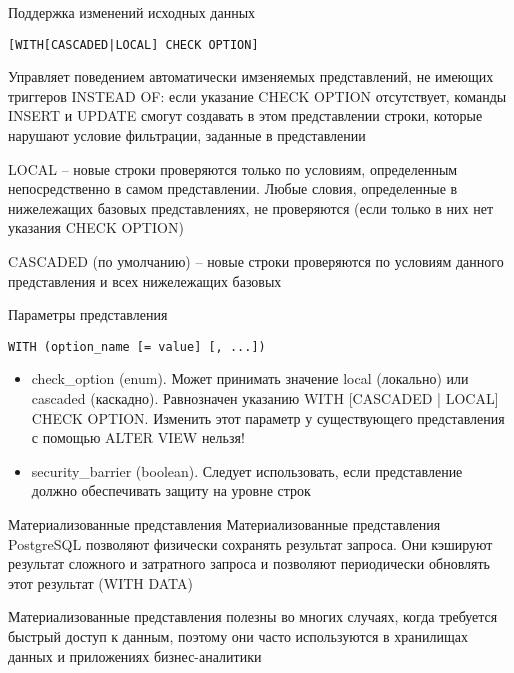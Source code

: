 \documentclass[12pt]{article}
\begin{document}
\begin{nota}{Поддержка изменений исходных данных}
\begin{lstlisting}
[WITH[CASCADED|LOCAL] CHECK OPTION]
\end{lstlisting}

    Управляет поведением автоматически имзеняемых представлений, не имеющих триггеров INSTEAD OF: если указание CHECK OPTION отсутствует, команды INSERT и UPDATE смогут создавать в этом представлении строки, которые нарушают условие фильтрации, заданные в представлении 

    LOCAL -- новые строки проверяются только по условиям, определенным непосредственно в самом представлении. Любые словия, определенные в нижележащих базовых представлениях, не проверяются (если только в них нет указания CHECK OPTION)

    CASCADED (по умолчанию) -- новые строки проверяются по условиям данного представления и всех нижележащих базовых 
\end{nota}

\begin{nota}{Параметры представления}
\begin{lstlisting}
WITH (option_name [= value] [, ...])
\end{lstlisting}

    \begin{itemize}
        \item check\_option (enum). Может принимать значение local (локально) или cascaded (каскадно). Равнозначен указанию WITH [CASCADED | LOCAL] CHECK OPTION. Изменить этот параметр у существующего представления с помощью ALTER VIEW нельзя!
        \item security\_barrier (boolean). Следует использовать, если представление должно обеспечивать защиту на уровне строк 
    \end{itemize}
\end{nota}

\begin{nota}{Материализованные представления}
    Материализованные представления PostgreSQL позволяют физически сохранять результат запроса. Они кэшируют результат сложного и затратного запроса и позволяют периодически обновлять этот результат (WITH DATA)

    Материализованные представления полезны во многих случаях, когда требуется быстрый доступ к данным, поэтому они часто используются в хранилищах данных и приложениях бизнес-аналитики 
\end{nota}
\end{document}
